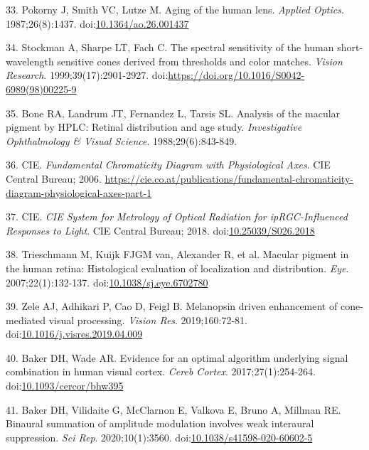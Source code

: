 \documentclass[
]{article}
\begin{document}
\leavevmode\hypertarget{ref-Pokorny1987}{}%
33. Pokorny J, Smith VC, Lutze M. Aging of the human lens. \emph{Applied Optics}. 1987;26(8):1437. doi:\href{https://doi.org/10.1364/ao.26.001437}{10.1364/ao.26.001437}

\leavevmode\hypertarget{ref-Stockman1999}{}%
34. Stockman A, Sharpe LT, Fach C. The spectral sensitivity of the human short-wavelength sensitive cones derived from thresholds and color matches. \emph{Vision Research}. 1999;39(17):2901-2927. doi:\href{https://doi.org/https://doi.org/10.1016/S0042-6989(98)00225-9}{https://doi.org/10.1016/S0042-6989(98)00225-9}

\leavevmode\hypertarget{ref-Bone1988}{}%
35. Bone RA, Landrum JT, Fernandez L, Tarsis SL. Analysis of the macular pigment by HPLC: Retinal distribution and age study. \emph{Investigative Ophthalmology \& Visual Science}. 1988;29(6):843-849.

\leavevmode\hypertarget{ref-CIE2006}{}%
36. CIE. \emph{Fundamental Chromaticity Diagram with Physiological Axes}. CIE Central Bureau; 2006. \url{https://cie.co.at/publications/fundamental-chromaticity-diagram-physiological-axes-part-1}

\leavevmode\hypertarget{ref-CIE2018}{}%
37. CIE. \emph{CIE System for Metrology of Optical Radiation for ipRGC-Influenced Responses to Light}. CIE Central Bureau; 2018. doi:\href{https://doi.org/10.25039/S026.2018}{10.25039/S026.2018}

\leavevmode\hypertarget{ref-Trieschmann2007}{}%
38. Trieschmann M, Kuijk FJGM van, Alexander R, et al. Macular pigment in the human retina: Histological evaluation of localization and distribution. \emph{Eye}. 2007;22(1):132-137. doi:\href{https://doi.org/10.1038/sj.eye.6702780}{10.1038/sj.eye.6702780}

\leavevmode\hypertarget{ref-Zele2019}{}%
39. Zele AJ, Adhikari P, Cao D, Feigl B. Melanopsin driven enhancement of cone-mediated visual processing. \emph{Vision Res}. 2019;160:72-81. doi:\href{https://doi.org/10.1016/j.visres.2019.04.009}{10.1016/j.visres.2019.04.009}

\leavevmode\hypertarget{ref-Baker2017}{}%
40. Baker DH, Wade AR. Evidence for an optimal algorithm underlying signal combination in human visual cortex. \emph{Cereb Cortex}. 2017;27(1):254-264. doi:\href{https://doi.org/10.1093/cercor/bhw395}{10.1093/cercor/bhw395}

\leavevmode\hypertarget{ref-Baker2020}{}%
41. Baker DH, Vilidaite G, McClarnon E, Valkova E, Bruno A, Millman RE. Binaural summation of amplitude modulation involves weak interaural suppression. \emph{Sci Rep}. 2020;10(1):3560. doi:\href{https://doi.org/10.1038/s41598-020-60602-5}{10.1038/s41598-020-60602-5}
\end{document}
